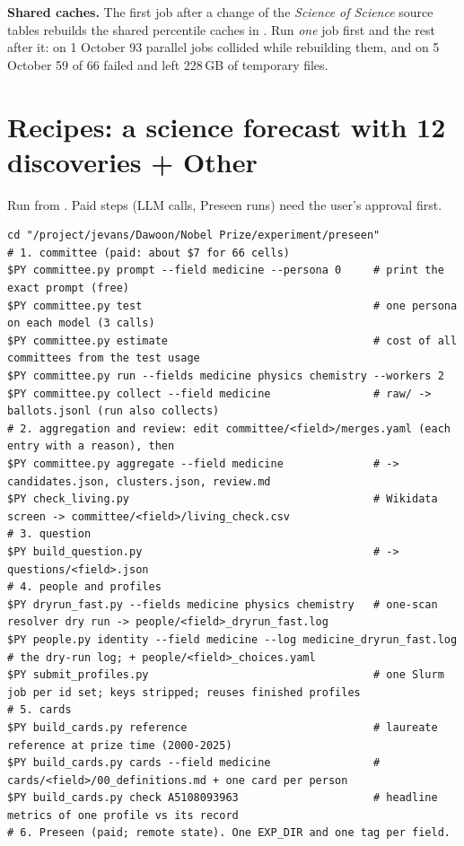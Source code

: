 \documentclass[11pt,a4paper]{article}
\newcommand{\file}[1]{\path{#1}}
\begin{document}
\noindent \textbf{Shared caches.} The first job after a change of the \emph{Science of Science} source tables rebuilds the
shared percentile caches in \file{cache/}. Run \emph{one} job first and the rest after it: on 1 October 93 parallel jobs
collided while rebuilding them, and on 5 October 59 of 66 failed and left 228\,GB of temporary files.

\section{Recipes: a science forecast with 12 discoveries + Other}\label{sec:use-science}

Run from \file{experiment/preseen/}. Paid steps (LLM calls, Preseen runs) need the user's approval first.

\begin{Verbatim}
cd "/project/jevans/Dawoon/Nobel Prize/experiment/preseen"
# 1. committee (paid: about $7 for 66 cells)
$PY committee.py prompt --field medicine --persona 0     # print the exact prompt (free)
$PY committee.py test                                    # one persona on each model (3 calls)
$PY committee.py estimate                                # cost of all committees from the test usage
$PY committee.py run --fields medicine physics chemistry --workers 2
$PY committee.py collect --field medicine                # raw/ -> ballots.jsonl (run also collects)
# 2. aggregation and review: edit committee/<field>/merges.yaml (each entry with a reason), then
$PY committee.py aggregate --field medicine              # -> candidates.json, clusters.json, review.md
$PY check_living.py                                      # Wikidata screen -> committee/<field>/living_check.csv
# 3. question
$PY build_question.py                                    # -> questions/<field>.json
# 4. people and profiles
$PY dryrun_fast.py --fields medicine physics chemistry   # one-scan resolver dry run -> people/<field>_dryrun_fast.log
$PY people.py identity --field medicine --log medicine_dryrun_fast.log   # the dry-run log; + people/<field>_choices.yaml
$PY submit_profiles.py                                   # one Slurm job per id set; keys stripped; reuses finished profiles
# 5. cards
$PY build_cards.py reference                             # laureate reference at prize time (2000-2025)
$PY build_cards.py cards --field medicine                # cards/<field>/00_definitions.md + one card per person
$PY build_cards.py check A5108093963                     # headline metrics of one profile vs its record
# 6. Preseen (paid; remote state). One EXP_DIR and one tag per field.

\end{Verbatim}
\end{document}

